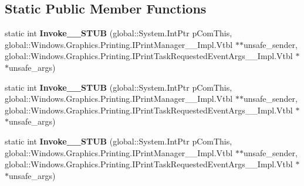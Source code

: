 \subsection*{Static Public Member Functions}
\begin{DoxyCompactItemize}
\item 
\mbox{\label{struct_windows_1_1_foundation_1_1_typed_event_handler___a___windows___graphics___printing___prindf9d13d6fccfa5e25b1b30b98b5a86a9_ac3d355442d5db04e015526601276c11a}} 
static int {\bfseries Invoke\+\_\+\+\_\+\+S\+T\+UB} (global\+::\+System.\+Int\+Ptr p\+Com\+This, global\+::\+Windows.\+Graphics.\+Printing.\+I\+Print\+Manager\+\_\+\+\_\+\+Impl.\+Vtbl $\ast$$\ast$unsafe\+\_\+sender, global\+::\+Windows.\+Graphics.\+Printing.\+I\+Print\+Task\+Requested\+Event\+Args\+\_\+\+\_\+\+Impl.\+Vtbl $\ast$$\ast$unsafe\+\_\+args)
\item 
\mbox{\label{struct_windows_1_1_foundation_1_1_typed_event_handler___a___windows___graphics___printing___prindf9d13d6fccfa5e25b1b30b98b5a86a9_ac3d355442d5db04e015526601276c11a}} 
static int {\bfseries Invoke\+\_\+\+\_\+\+S\+T\+UB} (global\+::\+System.\+Int\+Ptr p\+Com\+This, global\+::\+Windows.\+Graphics.\+Printing.\+I\+Print\+Manager\+\_\+\+\_\+\+Impl.\+Vtbl $\ast$$\ast$unsafe\+\_\+sender, global\+::\+Windows.\+Graphics.\+Printing.\+I\+Print\+Task\+Requested\+Event\+Args\+\_\+\+\_\+\+Impl.\+Vtbl $\ast$$\ast$unsafe\+\_\+args)
\item 
\mbox{\label{struct_windows_1_1_foundation_1_1_typed_event_handler___a___windows___graphics___printing___prindf9d13d6fccfa5e25b1b30b98b5a86a9_ac3d355442d5db04e015526601276c11a}} 
static int {\bfseries Invoke\+\_\+\+\_\+\+S\+T\+UB} (global\+::\+System.\+Int\+Ptr p\+Com\+This, global\+::\+Windows.\+Graphics.\+Printing.\+I\+Print\+Manager\+\_\+\+\_\+\+Impl.\+Vtbl $\ast$$\ast$unsafe\+\_\+sender, global\+::\+Windows.\+Graphics.\+Printing.\+I\+Print\+Task\+Requested\+Event\+Args\+\_\+\+\_\+\+Impl.\+Vtbl $\ast$$\ast$unsafe\+\_\+args)
\item 
\mbox{\label{struct_windows_1_1_foundation_1_1_typed_event_handler___a___windows___graphics___printing___prindf9d13d6fccfa5e25b1b30b98b5a86a9_ac3d355442d5db04e015526601276c11a}} 

\end{DoxyCompactItemize}
